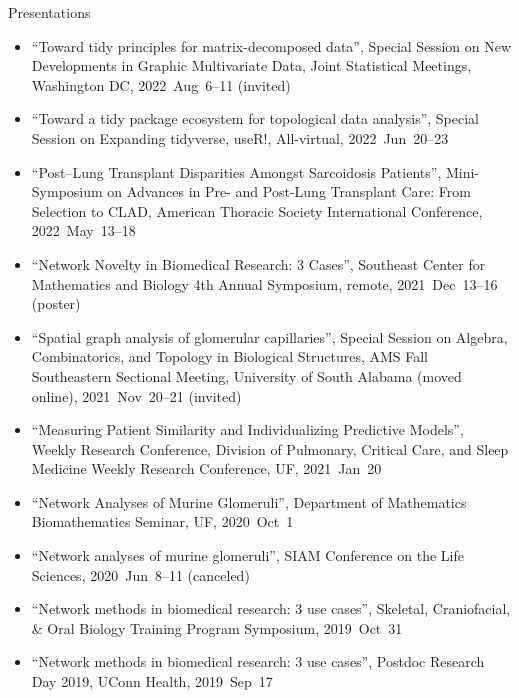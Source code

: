\documentclass[10pt,a4paper]{article}
\begin{document}
\vspace{.25cm}
{\sc Presentations}
\begin{itemize}[label=$\circ$,nolistsep]
\item
``Toward tidy principles for matrix-decomposed data'', Special Session on New Developments in Graphic Multivariate Data, Joint Statistical Meetings, Washington DC, 2022~Aug~6--11 (invited)
\item
``Toward a tidy package ecosystem for topological data analysis'', Special Session on Expanding {\sffamily tidyverse}, useR!, All-virtual, 2022~Jun~20--23
\item
``Post--Lung Transplant Disparities Amongst Sarcoidosis Patients'', Mini-Symposium on Advances in Pre- and Post-Lung Transplant Care: From Selection to CLAD, American Thoracic Society International Conference, 2022~May~13--18
\item
``Network Novelty in Biomedical Research: 3 Cases'', Southeast Center for Mathematics and Biology 4th Annual Symposium, remote, 2021~Dec~13--16 (poster)
\item
``Spatial graph analysis of glomerular capillaries'', Special Session on Algebra, Combinatorics, and Topology in Biological Structures, AMS Fall Southeastern Sectional Meeting, University of South Alabama (moved online), 2021~Nov~20--21 (invited)
\item
``Measuring Patient Similarity and Individualizing Predictive Models'', Weekly Research Conference, Division of Pulmonary, Critical Care, and Sleep Medicine Weekly Research Conference, UF, 2021~Jan~20
\item
``Network Analyses of Murine Glomeruli'', Department of Mathematics Biomathematics Seminar, UF, 2020~Oct~1
\item
``Network analyses of murine glomeruli'', SIAM Conference on the Life Sciences, 2020~Jun~8--11 (canceled)
\item
``Network methods in biomedical research: 3 use cases'', Skeletal, Craniofacial, \& Oral Biology Training Program Symposium, 2019~Oct~31
\item
``Network methods in biomedical research: 3 use cases'', Postdoc Research Day 2019, UConn Health, 2019~Sep~17

\end{itemize}
\end{document}
